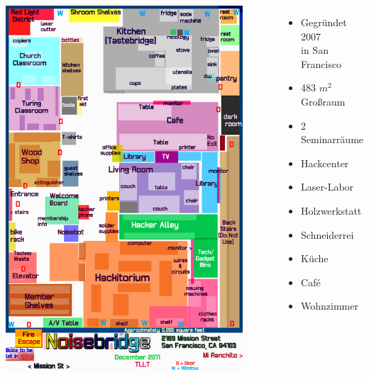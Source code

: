 \documentclass{beamer}
\begin{document}
  \begin{frame}
    \begin{columns}[l]
      \includegraphics[width=0.9\textwidth]{noisebridge-map.jpg}
      \begin{itemize}
        \item Gegründet 2007\\in San Francisco
        \item 483 $m^2$ Großraum
        \item 2 Seminarräume
        \item Hackcenter
        \item Laser-Labor
        \item Holzwerkstatt
        \item Schneiderrei
        \item Küche
        \item Café
        \item Wohnzimmer
      \end{itemize}
    \end{columns}
  \end{frame}
\end{document}

